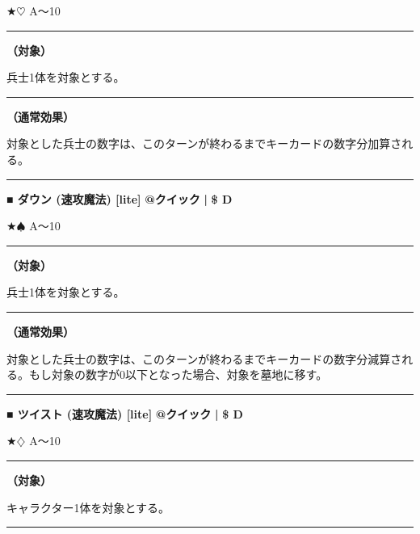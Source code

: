 \documentclass[twocolumn,a5paper,papersize,10pt]{jarticle}
\begin{document}
★{\normalsize $\heartsuit$} A〜10

\vspace{1mm}%
\hrule height 0.1mm depth 0mm width 66.5mm %
\vspace{1mm}%
{\bf（対象）}

兵士1体を対象とする。
\vspace{1mm}%
\hrule height 0.1mm depth 0mm width 66.5mm %
\vspace{1mm}%

{\bf（通常効果）}

対象とした兵士の数字は、このターンが終わるまでキーカードの数字分加算される。
\vspace{2mm} %
\hrule height 0.5mm depth 0mm width 66.5mm %
\vspace{1mm} %
{\normalsize\bf ■ ダウン {\scriptsize (速攻魔法) [lite]}} %
\hfill 
{\small\bf @クイック }
  {\small\bf | } {\small\bf \$ D}

★{\normalsize $\spadesuit$} A〜10

\vspace{1mm}%
\hrule height 0.1mm depth 0mm width 66.5mm %
\vspace{1mm}%
{\bf（対象）}

兵士1体を対象とする。
\vspace{1mm}%
\hrule height 0.1mm depth 0mm width 66.5mm %
\vspace{1mm}%

{\bf（通常効果）}

対象とした兵士の数字は、このターンが終わるまでキーカードの数字分減算される。もし対象の数字が0以下となった場合、対象を墓地に移す。
\vspace{2mm} %
\hrule height 0.5mm depth 0mm width 66.5mm %
\vspace{1mm} %
{\normalsize\bf ■ ツイスト {\scriptsize (速攻魔法) [lite]}} %
\hfill 
{\small\bf @クイック }
  {\small\bf | } {\small\bf \$ D}

★{\normalsize $\diamondsuit$} A〜10

\vspace{1mm}%
\hrule height 0.1mm depth 0mm width 66.5mm %
\vspace{1mm}%
{\bf（対象）}

キャラクター1体を対象とする。
\vspace{1mm}%
\hrule height 0.1mm depth 0mm width 66.5mm %
\vspace{1mm}%
\end{document}
